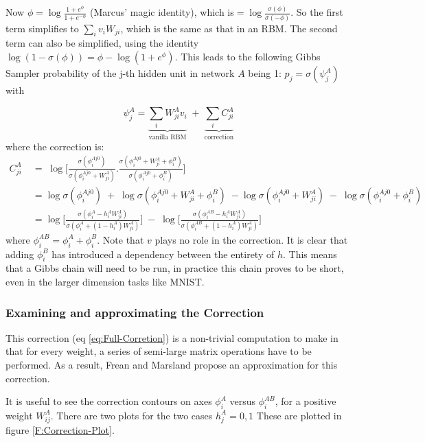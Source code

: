 Now $\phi = \log \frac{1+e^{\phi}}{1+e^{-\phi}}$ (Marcus' magic identity), which is$ = \log \frac{\sigma(\phi)}{\sigma(-\phi)}$.
So the first term simplifies to
$ \sum_i v_i W_{ji}$, which is the same as that in an RBM. The second term can also be simplified, using the identity $\log(1-\sigma(\phi)) = \phi - \log(1+e^\phi)$. This leads to the following Gibbs Sampler probability of the j-th hidden unit in network $A$ being 1: $p_j = \sigma(\psi_j^A)$ with

$$
\psi_j^A = \underbrace{\sum_i W^A_{ji} v_i}_\text{vanilla RBM} \; + \; \underbrace{\sum_i C^A_{ji}}_\text{correction} $$
where the correction is:
\begin{equation}\label{eq:Full-Corretion}
\begin{aligned}
C^A_{ji} \; &= \;\log \bigg[ \frac{\sigma (\phi_i^{Aj0})}{\sigma (\phi_i^{Aj0} + W^A_{ji})} . \frac{\sigma (\phi_i^{Aj0} + W_{ji}^A + \phi_i^B) }{\sigma (\phi_i^{Aj0} + \phi_i^B)} \bigg]
\\
&= \log \sigma(\phi_i^{Aj0})  \; + \; \log \sigma (\phi_i^{Aj0} + W^A_{ji} + \phi_i^B) \;- \log \sigma (\phi_i^{Aj0} + W^A_{ji})  \; - \; \log \sigma ( \phi_i^{Aj0} + \phi_i^B)
\\
&= \log \bigg[ \frac{\sigma(\phi_i^{A} - h^A_i W^A_{ji})}{\sigma (\phi_i^{A} + (1-h^A_i) W^A_{ji})} \bigg]  \; - \; \log \bigg[ \frac{ \sigma ( \phi_i^{AB} - h^A_i W^A_{ji})}{\sigma (\phi_i^{AB} + (1-h^A_i) W^A_{ji})} \bigg]
\end{aligned}
\end{equation}
where $\phi_i^{AB} = \phi_i^{A} + \phi_i^{B}$. Note that $v$ plays no role in the correction. It is clear that adding $\phi^B_i$ has introduced a dependency between the entirety of $h$. This means that a Gibbs chain will need to be run, in practice this chain proves to be short, even in the larger dimension tasks like MNIST.

\subsubsection{Examining and approximating the Correction}

This correction (eq \ref{eq:Full-Corretion}) is a non-trivial computation to make in that for every weight, a series of semi-large matrix operations have to be performed. As a result, Frean and Marsland propose an approximation for this correction.

It is useful to see the correction contours on axes $\phi^A_i$ versus $\phi^{AB}_i$, for a positive weight $W^A_{ij}$.
There are two plots for the two cases $h^A_j=0,1$ These are plotted in figure \ref{F:Correction-Plot}.

